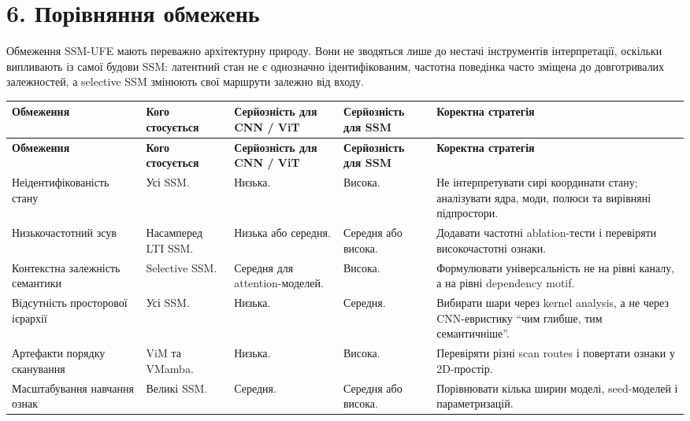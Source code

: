 \documentclass[12pt,a4paper]{article}
\begin{document}
\section*{6. Порівняння обмежень}

Обмеження SSM-UFE мають переважно архітектурну природу. Вони не
зводяться лише до нестачі інструментів інтерпретації, оскільки
випливають із самої будови SSM: латентний стан не є однозначно
ідентифікованим, частотна поведінка часто зміщена до довготривалих
залежностей, а selective SSM змінюють свої маршрути залежно від входу.

\begin{longtable}{p{3.5cm} p{3cm} p{2.7cm} p{2.7cm} p{4.2cm}}
\toprule
\textbf{Обмеження}
&
\textbf{Кого стосується}
&
\textbf{Серйозність для CNN / ViT}
&
\textbf{Серйозність для SSM}
&
\textbf{Коректна стратегія}
\\
\midrule
\endfirsthead

\toprule
\textbf{Обмеження}
&
\textbf{Кого стосується}
&
\textbf{Серйозність для CNN / ViT}
&
\textbf{Серйозність для SSM}
&
\textbf{Коректна стратегія}
\\
\midrule
\endhead

Неідентифікованість стану
&
Усі SSM.
&
Низька.
&
Висока.
&
Не інтерпретувати сирі координати стану; аналізувати ядра, моди,
полюси та вирівняні підпростори.
\\

Низькочастотний зсув
&
Насамперед LTI SSM.
&
Низька або середня.
&
Середня або висока.
&
Додавати частотні ablation-тести і перевіряти високочастотні ознаки.
\\

Контекстна залежність семантики
&
Selective SSM.
&
Середня для attention-моделей.
&
Висока.
&
Формулювати універсальність не на рівні каналу, а на рівні
dependency motif.
\\

Відсутність просторової ієрархії
&
Усі SSM.
&
Низька.
&
Середня.
&
Вибирати шари через kernel analysis, а не через CNN-евристику
``чим глибше, тим семантичніше''.
\\

Артефакти порядку сканування
&
ViM та VMamba.
&
Низька.
&
Висока.
&
Перевіряти різні scan routes і повертати ознаки у 2D-простір.
\\

Масштабування навчання ознак
&
Великі SSM.
&
Середня.
&
Середня або висока.
&
Порівнювати кілька ширин моделі, seed-моделей і параметризацій.
\\
\bottomrule
\end{longtable}
\end{document}
